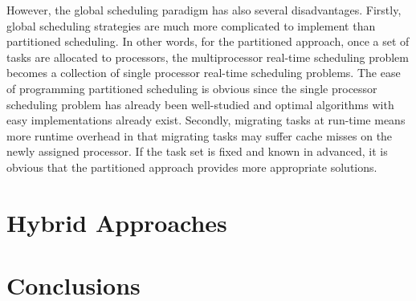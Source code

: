 \documentclass[preprint,12pt]{elsarticle}
\begin{document}
However, the global scheduling paradigm has also several disadvantages. 
Firstly, global scheduling strategies are much more complicated to implement than
partitioned scheduling. 
In other words, for the partitioned approach, once a set of tasks are allocated
to processors, the multiprocessor real-time scheduling problem becomes a
collection of single processor real-time scheduling problems.  The ease of
programming partitioned scheduling is obvious since the single processor
scheduling problem has already been well-studied and optimal algorithms with
easy implementations already exist.
Secondly, migrating tasks at run-time means more runtime overhead in that
migrating tasks may suffer cache misses on the newly assigned processor. If
the task set is fixed and known in advanced, it is obvious that the partitioned
approach provides more appropriate solutions.


\section{Hybrid Approaches} \label{S:4}

\section{Conclusions} \label{S:5}





\newpage








\end{document}
